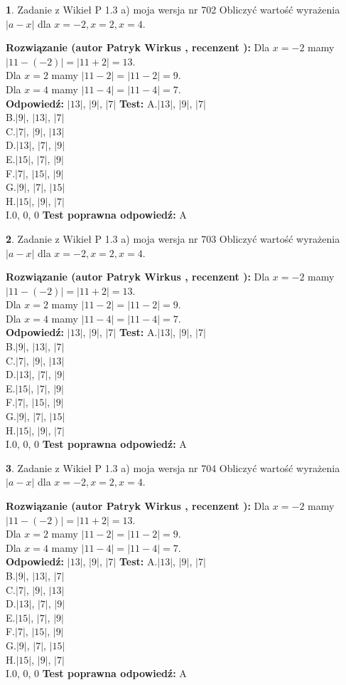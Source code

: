 \documentclass[12pt, a4paper]{article}
\theoremstyle{definition} %
\newtheorem{zad}{}
\newcommand{\zadStart}[1]{\begin{zad}#1\newline}
\newcommand{\zadStop}{\end{zad}}
\newcommand{\rozwStart}[2]{\noindent \textbf{Rozwiązanie (autor #1 , recenzent #2): }\newline}
\newcommand{\rozwStop}{\newline}
\newcommand{\odpStart}{\noindent \textbf{Odpowiedź:}\newline}
\newcommand{\odpStop}{\newline}
\newcommand{\testStart}{\noindent \textbf{Test:}\newline}
\newcommand{\testStop}{\newline}
\newcommand{\kluczStart}{\noindent \textbf{Test poprawna odpowiedź:}\newline}
\newcommand{\kluczStop}{\newline}
\begin{document}
\zadStart{Zadanie z Wikieł P 1.3 a) moja wersja nr 702}
Obliczyć wartość wyrażenia $|a - x|$ dla $x=-2,x=2,x=4$.
\zadStop
\rozwStart{Patryk Wirkus}{}
Dla $x = -2$ mamy $|11 - (-2)| = |11 + 2| = 13$.\\
Dla $x = 2$ mamy $|11 - 2| = |11 - 2| = 9$.\\
Dla $x = 4$ mamy $|11 - 4| = |11 - 4| = 7$.\\
\rozwStop
\odpStart
$|13|$, $|9|$, $|7|$
\odpStop
\testStart
A.$|13|$, $|9|$, $|7|$\\
B.$|9|$, $|13|$, $|7|$\\
C.$|7|$, $|9|$, $|13|$\\
D.$|13|$, $|7|$, $|9|$\\
E.$|15|$, $|7|$, $|9|$\\
F.$|7|$, $|15|$, $|9|$\\
G.$|9|$, $|7|$, $|15|$\\
H.$|15|$, $|9|$, $|7|$\\
I.$0$, $0$, $0$
\testStop
\kluczStart
A
\kluczStop



\zadStart{Zadanie z Wikieł P 1.3 a) moja wersja nr 703}
Obliczyć wartość wyrażenia $|a - x|$ dla $x=-2,x=2,x=4$.
\zadStop
\rozwStart{Patryk Wirkus}{}
Dla $x = -2$ mamy $|11 - (-2)| = |11 + 2| = 13$.\\
Dla $x = 2$ mamy $|11 - 2| = |11 - 2| = 9$.\\
Dla $x = 4$ mamy $|11 - 4| = |11 - 4| = 7$.\\
\rozwStop
\odpStart
$|13|$, $|9|$, $|7|$
\odpStop
\testStart
A.$|13|$, $|9|$, $|7|$\\
B.$|9|$, $|13|$, $|7|$\\
C.$|7|$, $|9|$, $|13|$\\
D.$|13|$, $|7|$, $|9|$\\
E.$|15|$, $|7|$, $|9|$\\
F.$|7|$, $|15|$, $|9|$\\
G.$|9|$, $|7|$, $|15|$\\
H.$|15|$, $|9|$, $|7|$\\
I.$0$, $0$, $0$
\testStop
\kluczStart
A
\kluczStop



\zadStart{Zadanie z Wikieł P 1.3 a) moja wersja nr 704}
Obliczyć wartość wyrażenia $|a - x|$ dla $x=-2,x=2,x=4$.
\zadStop
\rozwStart{Patryk Wirkus}{}
Dla $x = -2$ mamy $|11 - (-2)| = |11 + 2| = 13$.\\
Dla $x = 2$ mamy $|11 - 2| = |11 - 2| = 9$.\\
Dla $x = 4$ mamy $|11 - 4| = |11 - 4| = 7$.\\
\rozwStop
\odpStart
$|13|$, $|9|$, $|7|$
\odpStop
\testStart
A.$|13|$, $|9|$, $|7|$\\
B.$|9|$, $|13|$, $|7|$\\
C.$|7|$, $|9|$, $|13|$\\
D.$|13|$, $|7|$, $|9|$\\
E.$|15|$, $|7|$, $|9|$\\
F.$|7|$, $|15|$, $|9|$\\
G.$|9|$, $|7|$, $|15|$\\
H.$|15|$, $|9|$, $|7|$\\
I.$0$, $0$, $0$
\testStop
\kluczStart
A
\kluczStop
\end{document}
